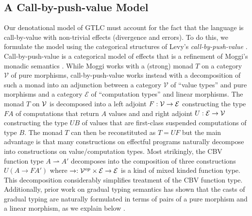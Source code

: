 \subsection{A Call-by-push-value Model}


Our denotational model of GTLC must account for the fact that the
language is call-by-value with non-trivial effects (divergence and
errors).  To do this, we formulate the model using the categorical
structures of Levy's \emph{call-by-push-value}
\cite{levy99}. Call-by-push-value is a categorical model of effects
that is a refinement of Moggi's monadic semantics
\cite{MOGGI199155}. While Moggi works with a (strong) monad $T$ on a
category $\mathcal V$ of pure morphisms, call-by-push-value works
instead with a decomposition of such a monad into an adjunction
between a category $\mathcal V$ of ``value types'' and pure morphisms
and a category $\mathcal E$ of ``computation types'' and linear
morphisms. The monad $T$ on $\mathcal{V}$ is decomposed into a left adjoint
$F : \mathcal{V} \to \mathcal{E}$ constructing the type $F A$ of computations that
return $A$ values and and right adjoint $U : \mathcal{E} \to \mathcal{V}$
constructing the type $U B$ of values that are first-class suspended
computations of type $B$. The monad $T$ can then be reconstituted as
$T = UF$ but the main advantage is that many constructions on
effectful programs naturally decompose into constructions on
value/computation types. Most strikingly, the CBV function type $A
\rightharpoonup A'$ decomposes into the composition of three
constructions $U(A \to F A')$ where $\to : \mathcal{V}^{op} \times \mathcal{E}
\to \mathcal{E}$ is a kind of mixed kinded function type. This decomposition
considerably simplifies treatment of the CBV function
type. Additionally, prior work on gradual typing semantics has shown
that the casts of gradual typing are naturally formulated in terms of
pairs of a pure morphism and a linear morphism, as we explain below
\cite{new-licata-ahmed2019}.

